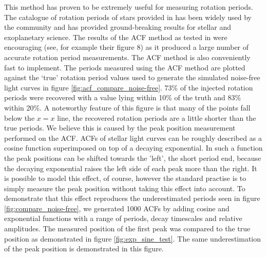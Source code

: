 This method has proven to be extremely useful for measuring rotation periods.
The catalogue of rotation periods of \Kepler stars provided in
\citet{mcquillan2013} has been widely used by the community and has provided
ground-breaking results for stellar and exoplanetary science.
The results of the ACF method as tested in \citet{aigrain2015} were
encouraging (see, for example their figure 8) as it produced a large number of
accurate rotation period measurements.
The ACF method is also conveniently fast to implement.
The periods measured using the ACF method are plotted against the `true'
rotation period values used to generate the simulated noise-free light curves
in figure \ref{fig:acf_compare_noise-free}.
73\% of the injected rotation periods were recovered with a value lying
within 10\% of the truth and 83\% within 20\%.
A noteworthy feature of this figure is that many of the points fall below the
$x=x$ line, \ie the recovered rotation periods are a little shorter than the
true periods.
We believe this is caused by the peak position measurement performed on the
ACF.
ACFs of stellar light curves can be roughly described as a cosine function
superimposed on top of a decaying exponential.
In such a function the peak positions can be shifted towards the 'left', \ie
the short period end, because the decaying exponential raises the left side of
each peak more than the right.
It is possible to model this effect, of course, however the standard practise
is to simply measure the peak position without taking this effect into
account.
To demonstrate that this effect reproduces the underestimated periods seen in
figure \ref{fig:compare_noise-free}, we generated 1000 ACFs by adding cosine
and exponential functions with a range of periods, decay timescales and
relative amplitudes.
The measured position of the first peak was compared to the true position as
demonstrated in figure \ref{fig:exp_sine_test}.
The same underestimation of the peak position is demonstrated in this figure.

